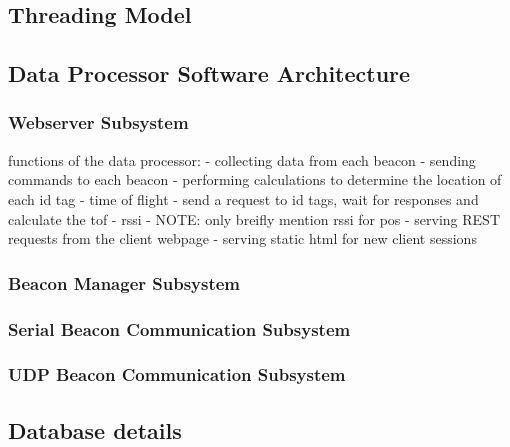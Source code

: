 \subsection{Threading Model}

\subsection{Data Processor Software Architecture}
\subsubsection{Webserver Subsystem}
functions of the data processor:
	- collecting data from each beacon
	- sending commands to each beacon
	- performing calculations to determine the location of each id tag
		- time of flight
			- send a request to id tags, wait for responses and calculate the tof
		- rssi
			- NOTE: only breifly mention rssi for pos
	- serving REST requests from the client webpage
	- serving static html for new client sessions

\subsubsection{Beacon Manager Subsystem}

\subsubsection{Serial Beacon Communication Subsystem}

\subsubsection{UDP Beacon Communication Subsystem}


\subsection{Database details}

